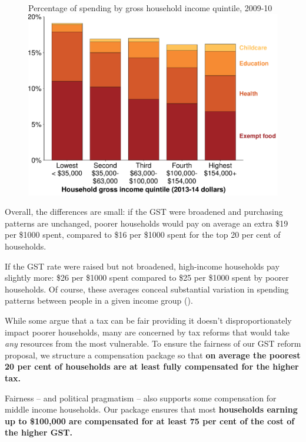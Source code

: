 \documentclass{grattanAlpha}
\begin{document}
\begin{figure}
%
{Percentage of spending by gross household income quintile, 2009-10}
\includegraphics[width=\columnwidth]{atlas/figure/GST-Figure-4-1-tikzd.pdf}
\end{figure}

Overall, the differences are small: if the GST were broadened and purchasing patterns are unchanged, poorer households would pay on average an extra \$19 per \$1000 spent, compared to \$16 per \$1000 spent for the top 20 per cent of households. 

If the GST rate were raised but not broadened, high-income households pay slightly more:  \$26 per \$1000 spent compared to \$25 per \$1000 spent by poorer households. Of course, these averages conceal substantial variation in spending patterns between people in a given income group ().

While some argue that a tax can be fair providing it doesn’t disproportionately impact poorer households, many are concerned by tax reforms that would take \emph{any} resources from the most vulnerable. To ensure the fairness of our GST reform proposal, we structure a compensation package so that \textbf{on average the poorest 20 per cent of households are at least fully compensated for the higher tax.} 

Fairness – and political pragmatism – also supports some compensation for middle income households. Our package ensures that most \textbf{households earning up to \$100,000 are compensated for at least 75 per cent of the cost of the higher GST.}
\end{document}
